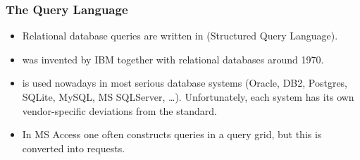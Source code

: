 \documentclass[dvipsnames,handout]{beamer}
\begin{document}
\begin{frame}
\begin{itemize}


\end{itemize}
\end{frame}


\begin{frame}[squeeze]
\frametitle{The \sql{} Query Language}

  \begin{itemize}
  \item Relational database queries are written in \sql{}
    (Structured Query Language).

  \item \sql{} was invented by IBM together with relational
    databases around 1970.

  \item \sql{} is used nowadays in most serious database systems
    (Oracle, DB2, Postgres, SQLite, MySQL, MS SQLServer, \ldots).
    Unfortunately, each system has its own vendor-specific deviations
    from the \sql{} standard.

  \item In MS Access one often constructs queries in a query grid, but
    this is converted into \sql{} requests.
  \end{itemize}

\end{frame}
\end{document}
